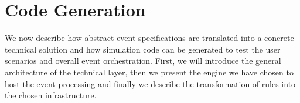 \section{Code Generation}
\label{sec:CG}

We now describe how abstract event specifications are translated into a concrete technical solution and how simulation code can be generated to test the user scenarios and overall event orchestration. First, we will introduce the general architecture of the \IOTDSL technical layer, then we present the engine we have chosen to host the event processing and finally we describe the transformation of \IOTDSL rules into the chosen infrastructure.



